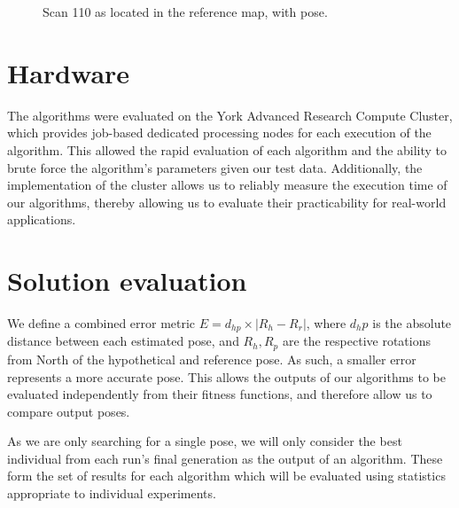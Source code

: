 \documentclass[authoryearcitations]{UoYCSproject}
\begin{document}
\begin{figure}
\begin{subfigure}[b]{0.3\textwidth}

\end{subfigure}
\caption{Scan 110 as located in the reference map, with pose.}
\label{fig:scan110}
\end{figure}

\section{Hardware}
The algorithms were evaluated on the York Advanced Research Compute Cluster, which provides job-based dedicated processing nodes for each execution of the algorithm. This allowed the rapid evaluation of each algorithm and the ability to brute force the algorithm's parameters given our test data. Additionally, the implementation of the cluster allows us to reliably measure the execution time of our algorithms, thereby allowing us to evaluate their practicability for real-world applications.

\section{Solution evaluation}
We define a combined error metric $E=d_{hp}\times |R_h-R_r|$, where $d_hp$ is the absolute distance between each estimated pose, and $R_h, R_p$ are the respective rotations from North of the hypothetical and reference pose. As such, a smaller error represents a more accurate pose. This allows the outputs of our algorithms to be evaluated independently from their fitness functions, and therefore allow us to compare output poses.

As we are only searching for a single pose, we will only consider the best individual from each run's final generation as the output of an algorithm. These form the set of results for each algorithm which will be evaluated using statistics appropriate to individual experiments. 
\end{document}
